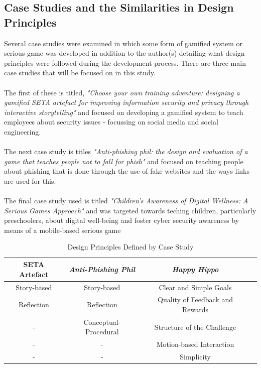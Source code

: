\documentclass[conference]{IEEEtran}
\begin{document}
\subsection{Case Studies and the Similarities in Design Principles}
Several case studies were examined in which some form of gamified system or serious game was developed in addition to the author(s) detailing what design principles were followed during the development process. There are three main case studies that will be focused on in this study\cite{Dincelli2020,Sheng2007,allers2021children}.
\\\\
The first of these is titled, \textit{"Choose your own training adventure: designing a gamified SETA artefact for improving information security and privacy through interactive storytelling"} and focused on developing a gamified system to teach employees about security issues - focussing on social media and social engineering\cite{Dincelli2020}. 
\\\\
The next case study is titles \textit{"Anti-phishing phil: the design and evaluation of a game that teaches people not to fall for phish"} and focused on teaching people about phishing that is done through the use of fake websites and the ways links are used for this\cite{Sheng2007}. 
\\\\
The final case study used is titled \textit{"Children’s Awareness of Digital Wellness: A Serious Games Approach"} and was targeted towards teching children, particularly preschoolers, about digital well-being and foster cyber security awareness by means of a mobile-based serious game\cite{allers2021children}
\begin{table}[htbp]
\caption{Design Principles Defined by Case Study \cite{Dincelli2020,Sheng2007,allers2021children}}
\begin{adjustwidth}{-0.6cm}{}
\begin{tabular}{|c|c|c|c|}
\hline

\textbf{SETA Artefact} & \textbf{\textit{Anti-Phishing Phil}}& \textbf{\textit{Happy Hippo}} \\
\hline
Story-based	& Story-based 			& Clear and Simple Goals  \\
Reflection	& Reflection			& Quality of Feedback and Rewards  \\
	-		& Conceptual-Procedural & Structure of the Challenge  \\
	-		& 		-				& Motion-based Interaction  \\
	-		& 		-				& Simplicity  \\
\hline

\end{tabular}
\label{tab1}
\end{adjustwidth}
\end{table}
\end{document}
